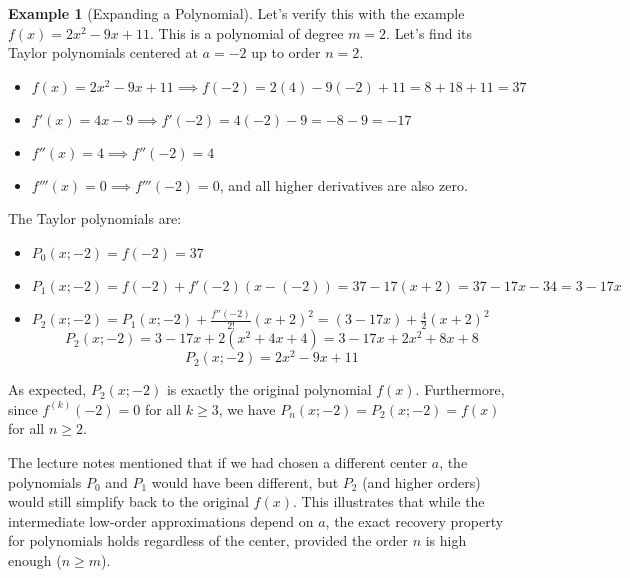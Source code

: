 \documentclass[11pt]{article}
\theoremstyle{definition}
\newtheorem{example}[theorem]{Example}
\theoremstyle{remark}
\begin{document}
    \begin{example}[Expanding a Polynomial]
    Let's verify this with the example $f(x) = 2x^2 - 9x + 11$. This is a polynomial of degree $m=2$. Let's find its Taylor polynomials centered at $a=-2$ up to order $n=2$.
    \begin{itemize}
        \item $f(x) = 2x^2 - 9x + 11 \implies f(-2) = 2(4) - 9(-2) + 11 = 8 + 18 + 11 = 37$
        \item $f'(x) = 4x - 9 \implies f'(-2) = 4(-2) - 9 = -8 - 9 = -17$
        \item $f''(x) = 4 \implies f''(-2) = 4$
        \item $f'''(x) = 0 \implies f'''(-2) = 0$, and all higher derivatives are also zero.
    \end{itemize}
    The Taylor polynomials are:
    \begin{itemize}
        \item $P_0(x; -2) = f(-2) = 37$
        \item $P_1(x; -2) = f(-2) + f'(-2)(x - (-2)) = 37 - 17(x+2) = 37 - 17x - 34 = 3 - 17x$
        \item $P_2(x; -2) = P_1(x; -2) + \frac{f''(-2)}{2!}(x+2)^2 = (3 - 17x) + \frac{4}{2}(x+2)^2$
          \[ P_2(x; -2) = 3 - 17x + 2(x^2 + 4x + 4) = 3 - 17x + 2x^2 + 8x + 8 \]
          \[ P_2(x; -2) = 2x^2 - 9x + 11 \]
    \end{itemize}
    As expected, $P_2(x; -2)$ is exactly the original polynomial $f(x)$. Furthermore, since $f^{(k)}(-2) = 0$ for all $k \ge 3$, we have $P_n(x; -2) = P_2(x; -2) = f(x)$ for all $n \ge 2$.

    The lecture notes mentioned that if we had chosen a different center $a$, the polynomials $P_0$ and $P_1$ would have been different, but $P_2$ (and higher orders) would still simplify back to the original $f(x)$. This illustrates that while the intermediate low-order approximations depend on $a$, the exact recovery property for polynomials holds regardless of the center, provided the order $n$ is high enough ($n \ge m$).
    \end{example}
\end{document}
